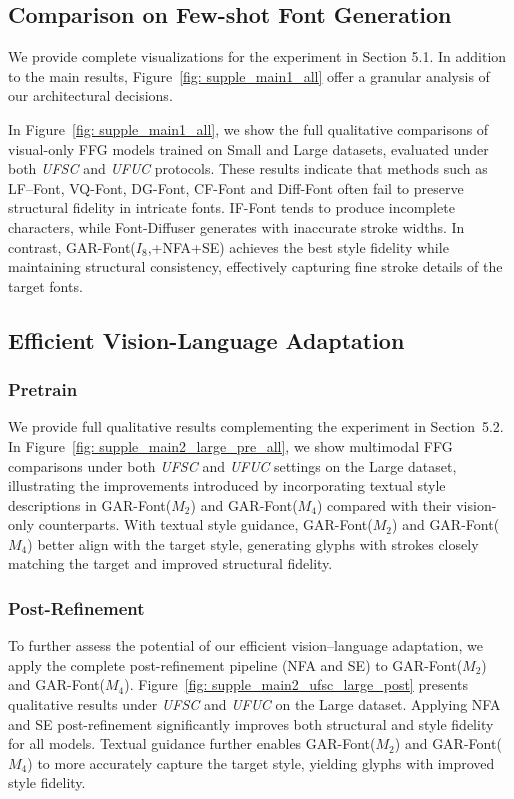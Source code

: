\subsection{Comparison on Few-shot Font Generation}
We provide complete visualizations for the experiment in Section 5.1. In addition to the main results, Figure~\ref{fig: supple_main1_all} offer a granular analysis of our architectural decisions. 

In Figure~\ref{fig: supple_main1_all}, we show the full qualitative comparisons of visual-only FFG models trained on Small and Large datasets, evaluated under both \textit{UFSC} and \textit{UFUC} protocols. These results indicate that methods such as LF--Font, VQ-Font, DG-Font, CF-Font and Diff-Font often fail to preserve structural fidelity in intricate fonts. IF-Font tends to produce incomplete characters, while Font-Diffuser generates with inaccurate stroke widths. In contrast, GAR-Font($I_8$,+NFA+SE) achieves the best style fidelity while maintaining structural consistency, effectively capturing fine stroke details of the target fonts.


\subsection{Efficient Vision-Language Adaptation}

\subsubsection{Pretrain}

We provide full qualitative results complementing the experiment in Section~5.2. 
In Figure~\ref{fig: supple_main2_large_pre_all}, we show multimodal FFG comparisons under both \textit{UFSC} and \textit{UFUC} settings on the Large dataset, illustrating the improvements introduced by incorporating textual style descriptions in GAR-Font($M_2$) and GAR-Font($M_4$) compared with their vision-only counterparts. With textual style guidance, GAR-Font($M_2$) and GAR-Font($M_4$) better align with the target style, generating glyphs with strokes closely matching the target and improved structural fidelity.


\subsubsection{Post-Refinement}
To further assess the potential of our efficient vision–language adaptation, we apply the complete post-refinement pipeline (NFA and SE) to GAR-Font($M_2$) and GAR-Font($M_4$). 
Figure~\ref{fig: supple_main2_ufsc_large_post} presents qualitative results under \textit{UFSC} and \textit{UFUC} on the Large dataset. Applying NFA and SE post-refinement significantly improves both structural and style fidelity for all models. Textual guidance further enables GAR-Font($M_2$) and GAR-Font($M_4$) to more accurately capture the target style, yielding glyphs with improved style fidelity.


